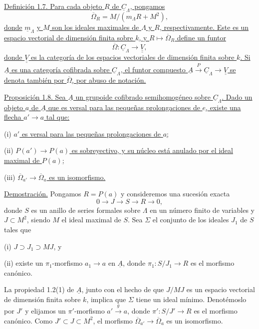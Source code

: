 
\underline{Definición 1.7. Para cada objeto $R$ de
$\underline C_\Lambda$, pongamos}
\[
 \overline\Omega_R=M/(m_\Lambda R+M^2),
\]
\underline{donde} $\underline{m}_\Lambda$ \underline{y $M$ son los ideales maximales de
$\Lambda$ y $R$, respectivamente. Este es un espacio vectorial de
dimensión finita sobre $k$, y $R\longmapsto\overline\Omega_R$ define
un funtor}
\[
 \overline\Omega:\underline C_\Lambda
   \longrightarrow\underline{\underline V},
\]
\underline{donde $\underline{\underline V}$ es la categoría de los
espacios vectoriales de dimensión finita sobre $k$. Si $\underline A$
es una categoría cofibrada sobre $\underline C_\Lambda$, el funtor
compuesto $\underline A\xrightarrow P\underline C_\Lambda
\longrightarrow\underline{\underline V}$ se denota también por
$\overline\Omega$, por abuso de notación.}

\underline{Proposición 1.8. Sea $\underline A$ un grupoide cofibrado
semihomogéneo sobre $\underline C_\Lambda$. Dado un objeto $a$ de
$\underline A$ que es versal para las pequeñas prolongaciones de $e$,
existe una flecha $a'\longrightarrow a$ tal que:}


(i) \underline{$a'$ es versal para las pequeñas prolongaciones de $a$;}

(ii) \underline{$P(a')\longrightarrow P(a)$ es sobreyectivo, y su
núcleo está anulado por el ideal maximal de $P(a)$;}

(iii) \underline{$\overline\Omega_{a'}\longrightarrow
\overline\Omega_a$ es un isomorfismo.}

\underline{Demostración.} Pongamos $R=P(a)$ y consideremos una sucesión
exacta
\[
 0\longrightarrow J\longrightarrow S\longrightarrow R
 \longrightarrow0,
\]
donde $S$ es un anillo de series formales sobre $\Lambda$ en un número
finito de variables y $J\subset M^2$, siendo $M$ el ideal maximal de
$S$. Sea $\Sigma$ el conjunto de los ideales $J_1$ de $S$ tales que

(i) $J\supset J_1\supset MJ$, y

(ii) existe un $\pi_1$-morfismo $a_1\longrightarrow a$ en
$\underline A$, donde $\pi_1:S/J_1\longrightarrow R$ es el morfismo
canónico.

La propiedad 1.2(1) de $\underline A$, junto con el hecho de que $J/MJ$
es un espacio vectorial de dimensión finita sobre $k$, implica que
$\Sigma$ tiene un ideal mínimo. Denotémoslo por $J'$ y elijamos un
$\pi'$-morfismo $a'\xrightarrow g a$, donde
$\pi':S/J'\longrightarrow R$ es el morfismo canónico. Como
$J'\subset J\subset M^2$, el morfismo
$\overline\Omega_{a'}\longrightarrow\overline\Omega_a$ es un
isomorfismo.

